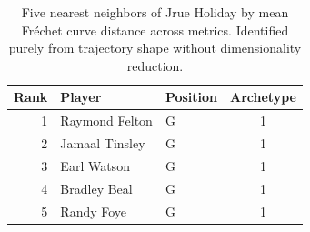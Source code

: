 \begin{table}[htbp]
  \centering\small
  \begin{tabular}{rllc}
    \toprule
    Rank & Player & Position & Archetype \\
    \midrule
    1 & Raymond Felton & G & 1 \\
    2 & Jamaal Tinsley & G & 1 \\
    3 & Earl Watson & G & 1 \\
    4 & Bradley Beal & G & 1 \\
    5 & Randy Foye & G & 1 \\
    \bottomrule
  \end{tabular}
  \caption{Five nearest neighbors of Jrue Holiday by mean Fr\'{e}chet curve distance across metrics. Identified purely from trajectory shape without dimensionality reduction.}
  \label{tab:Jrue_Holiday_frechet_curve_neighbors}
\end{table}

